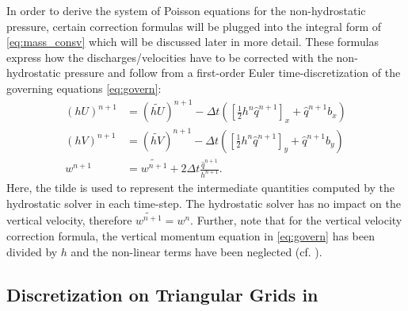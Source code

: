 In order to derive the system of Poisson equations for the non-hydrostatic pressure, certain correction formulas will be plugged into the integral form of \eqref{eq:mass_consv} which will be discussed later in more detail. These formulas express how the discharges/velocities have to be corrected with the non-hydrostatic pressure and follow from a first-order Euler time-discretization of the governing equations \eqref{eq:govern}:
\begin{align}
(hU)^{n+1}&= (\widetilde{hU})^{n+1} -\Delta t \left(\left[\frac{1}{2}h^{n}\hat{q}^{n+1}\right]_x+\hat q^{n+1}b_x\right)
\\
(hV)^{n+1}&= (\widetilde{hV})^{n+1} -\Delta t \left(\left[\frac{1}{2}h^{n}\hat{q}^{n+1}\right]_y+\hat q^{n+1}b_y\right)
\\
w^{n+1}&= \widetilde{w^{n+1}}+ 2\Delta t \frac{\hat q^{n+1}}{h^{n+1}}.
\end{align}
Here, the tilde is used to represent the intermediate quantities computed by the hydrostatic solver in each time-step. The hydrostatic solver has no impact on the vertical velocity, therefore $\widetilde{w^{n+1}}=w^{n}$. Further, note that for the vertical velocity correction formula, the vertical momentum equation in  \eqref{eq:govern} has been divided by $h$ and the non-linear terms have been neglected (cf. \cite{cui}).





\subsection{Discretization on Triangular Grids in \samoa}
